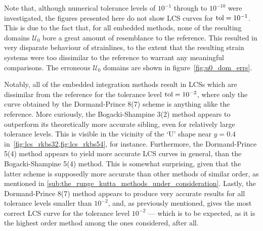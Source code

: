 Note that, although numerical tolerance levels of $10^{-1}$ through to
$10^{-10}$ were investigated, the figures presented here do not show LCS curves
for $\textnormal{tol}=10^{-1}$. This is due to the fact that, for all
embedded methods, none of the resulting domains $\mathcal{U}_{0}$ bore
a great amount of resemblance to the reference. This resulted in very disparate
behaviour of strainlines, to the extent that the resulting strain systems were
too dissimilar to the reference to warrant any meaningful comparisons. The
erroneous $\mathcal{U}_{0}$ domains are shown in figure~\ref{fig:u0_dom_errs}.

Notably, all of the embedded integration methods result in LCSs which are
dissimilar from the reference for the tolerance level $\textnormal{tol}=10^{-2}$,
where only the curve obtained by the Dormand-Prince 8(7) scheme is anything
alike the reference. More curiously, the Bogacki-Shampine 3(2) method appears
to outperform its theoretically more accurate sibling, even for relatively
large tolerance levels. This is visible in the
vicinity of the `U' shape near $y=0.4$ in~\cref{fig:lcs_rkbs32,fig:lcs_rkbs54},
for instance. Furthermore, the Dormand-Prince 5(4) method appears to yield more
accurate LCS curves in general, than the Bogacki-Shampine 5(4) method. This
is somewhat surprising, given that the latter scheme is supposedly more accurate
than other methods of similar order, as mentioned in
\cref{sub:the_runge_kutta_methods_under_consideration}. Lastly, the
Dormand-Prince 8(7) method appears to produce very accurate results for all
tolerance levels smaller than $10^{-2}$, and, as previously mentioned, gives
the most correct LCS curve for the tolerance level $10^{-2}$
--- which is to be expected, as it is the highest order method among the ones
considered, after all.









